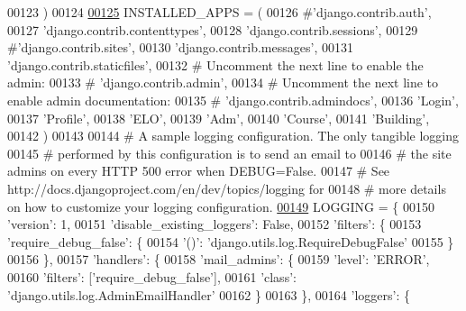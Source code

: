 \begin{DoxyCode}
00123 )
00124 
\hypertarget{settings_8py_source_l00125}{}\hyperlink{namespaceELO_1_1settings_a1a4752075da59d93477195bcc3fc4765}{00125} INSTALLED\_APPS = (
00126     \textcolor{comment}{#'django.contrib.auth',}
00127     \textcolor{stringliteral}{'django.contrib.contenttypes'},
00128     \textcolor{stringliteral}{'django.contrib.sessions'},
00129     \textcolor{comment}{#'django.contrib.sites',}
00130     \textcolor{stringliteral}{'django.contrib.messages'},
00131     \textcolor{stringliteral}{'django.contrib.staticfiles'},
00132     \textcolor{comment}{# Uncomment the next line to enable the admin:}
00133     \textcolor{comment}{# 'django.contrib.admin',}
00134     \textcolor{comment}{# Uncomment the next line to enable admin documentation:}
00135     \textcolor{comment}{# 'django.contrib.admindocs',}
00136     \textcolor{stringliteral}{'Login'},
00137     \textcolor{stringliteral}{'Profile'},
00138     \textcolor{stringliteral}{'ELO'},
00139     \textcolor{stringliteral}{'Adm'},
00140     \textcolor{stringliteral}{'Course'},
00141     \textcolor{stringliteral}{'Building'},
00142 )
00143 
00144 \textcolor{comment}{# A sample logging configuration. The only tangible logging}
00145 \textcolor{comment}{# performed by this configuration is to send an email to}
00146 \textcolor{comment}{# the site admins on every HTTP 500 error when DEBUG=False.}
00147 \textcolor{comment}{# See http://docs.djangoproject.com/en/dev/topics/logging for}
00148 \textcolor{comment}{# more details on how to customize your logging configuration.}
\hypertarget{settings_8py_source_l00149}{}\hyperlink{namespaceELO_1_1settings_addc421e02af1569796e2d33b2bc62ff5}{00149} LOGGING = \{
00150     \textcolor{stringliteral}{'version'}: 1,
00151     \textcolor{stringliteral}{'disable\_existing\_loggers'}: \textcolor{keyword}{False},
00152     \textcolor{stringliteral}{'filters'}: \{
00153         \textcolor{stringliteral}{'require\_debug\_false'}: \{
00154             \textcolor{stringliteral}{'()'}: \textcolor{stringliteral}{'django.utils.log.RequireDebugFalse'}
00155         \}
00156     \},
00157     \textcolor{stringliteral}{'handlers'}: \{
00158         \textcolor{stringliteral}{'mail\_admins'}: \{
00159             \textcolor{stringliteral}{'level'}: \textcolor{stringliteral}{'ERROR'},
00160             \textcolor{stringliteral}{'filters'}: [\textcolor{stringliteral}{'require\_debug\_false'}],
00161             \textcolor{stringliteral}{'class'}: \textcolor{stringliteral}{'django.utils.log.AdminEmailHandler'}
00162         \}
00163     \},
00164     \textcolor{stringliteral}{'loggers'}: \{

\end{DoxyCode}
